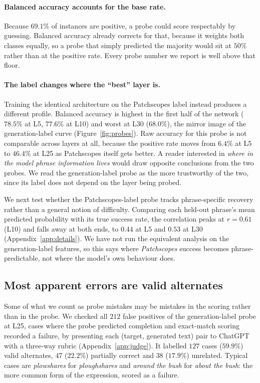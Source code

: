 \paragraph{Balanced accuracy accounts for the base rate.}
Because $69.1\%$ of instances are positive, a probe could score respectably by
guessing. Balanced accuracy already corrects for that, because it weights both
classes equally, so a probe that simply predicted the majority would sit at $50\%$
rather than at the positive rate. Every probe number we report is well above
that floor.

\paragraph{The label changes where the ``best'' layer is.}
Training the identical architecture on the Patchscopes label instead produces a
different profile. Balanced accuracy is highest in the first half of the network ($78.5\%$ at L5, $77.6\%$ at L10) and worst at L30 ($68.0\%$), the
mirror image of the generation-label curve (Figure~\ref{fig:probes}). Raw
accuracy for this probe is not comparable across layers at all, because the
positive rate moves from $6.4\%$ at L5 to $46.4\%$ at L25 as Patchscopes itself
gets better.
A reader interested in \emph{where in the model phrase information lives} would
draw opposite conclusions from the two probes. We read the generation-label
probe as the more trustworthy of the two, since its label does not depend on the
layer being probed.

We next test whether the Patchscopes-label probe tracks phrase-specific
recovery rather than a general notion of difficulty. Comparing each held-out
phrase's mean predicted probability with its true success rate, the correlation
peaks at $r=0.61$ (L10) and falls away at both ends, to $0.44$ at L5 and $0.53$
at L30 (Appendix~\ref{app:details}). We have not run the equivalent analysis on
the generation-label features, so this says where \emph{Patchscopes} success
becomes phrase-predictable, not where the model's own behaviour does.

\subsection{Most apparent errors are valid alternates}
\label{sec:falsepos}

Some of what we count as probe mistakes may be mistakes in the scoring rather
than in the probe. We checked all $212$ false positives of the generation-label
probe at L25, cases where the probe predicted completion and exact-match
scoring recorded a failure, by presenting each (target, generated text) pair to
ChatGPT with a three-way rubric (Appendix~\ref{app:judge}). It labelled $127$
cases ($59.9\%$) valid alternates, $47$ ($22.2\%$) partially correct and $38$
($17.9\%$) unrelated. Typical cases are \textit{plowshares} for
\textit{ploughshares} and \textit{around the bush} for \textit{about the bush}:
the more common form of the expression, scored as a failure.


